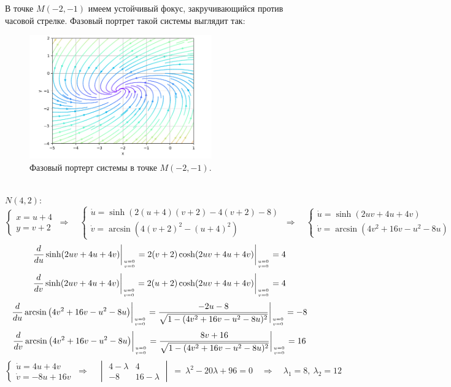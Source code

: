 \documentclass[a4paper]{article}
\newcommand{\at}{\biggr\rvert}
\begin{document}
В точке $M(-2, -1)$ имеем устойчивый фокус, закручивающийся против часовой стрелке.\newpage
Фазовый портрет такой системы выглядит так:
\begin{figure}[H]
    \centering \includegraphics[width=0.7\textwidth]{df_1.png}
    \caption{Фазовый портерт системы в точке $M(-2, -1)$.}
\end{figure}\,\\
$N(4, 2)$:
$$\begin{cases}
        x = u + 4 \\
        y = v + 2
    \end{cases} \  \Rightarrow \quad \begin{cases}
        \dot{u} = \sinh(2(u + 4)(v + 2) - 4(v + 2) - 8) \\
        \dot{v} = \arcsin\left( 4(v + 2)^2 - (u + 4)^2 \right)
    \end{cases} \ \Rightarrow\quad \begin{cases}
        \dot{u} = \sinh(2uv + 4u + 4v) \\
        \dot{v} = \arcsin\left( 4v^2 + 16v - u^2 - 8u \right)
    \end{cases}$$
$$\frac{d}{du}\sinh(2uv + 4u + 4v)\at_{u=0 \atop v=0} = 2(v+2)\cosh(2uv+4u+4v)\at_{u=0 \atop v=0} = 4$$
$$\frac{d}{dv}\sinh(2uv + 4u + 4v)\at_{u=0 \atop v=0} = 2(u+2)\cosh(2uv+4u+4v)\at_{u=0 \atop v=0} = 4$$
$$\frac{d}{du}\arcsin\left( 4v^2 + 16v - u^2 - 8u \right)\at_{u=0 \atop v=0} = \frac{-2u-8}{\sqrt{1 - (4v^2 + 16v - u^2 - 8u)^2}}\at_{u=0 \atop v=0} = -8$$
$$\frac{d}{dv}\arcsin\left( 4v^2 + 16v - u^2 - 8u \right)\at_{u=0 \atop v=0} = \frac{8v+16}{\sqrt{1 - (4v^2 + 16v - u^2 - 8u)^2}}\at_{u=0 \atop v=0} = 16$$
$$\begin{cases}
        \dot{u} = 4u+4v \\
        \dot{v} = -8u+16v
    \end{cases} \ \Rightarrow\quad \begin{vmatrix}
        4-\lambda & 4          \\
        -8        & 16-\lambda
    \end{vmatrix} \ =\ \lambda^{2} - 20 \lambda + 96 = 0 \quad\Rightarrow\quad \lambda_1 = 8,\ \lambda_2 = 12$$
\end{document}
